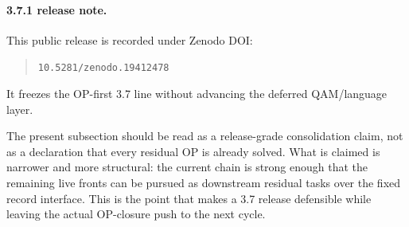 \paragraph{3.7.1 release note.}
This public release is recorded under Zenodo DOI:
\begin{quote}
\texttt{10.5281/zenodo.19412478}
\end{quote}
It freezes the OP-first 3.7 line without advancing the deferred QAM/language layer.

The present subsection should be read as a release-grade consolidation claim, not as a declaration that every residual OP is already solved. What is claimed is narrower and more structural: the current chain is strong enough that the remaining live fronts can be pursued as downstream residual tasks over the fixed record interface. This is the point that makes a 3.7 release defensible while leaving the actual OP-closure push to the next cycle.

